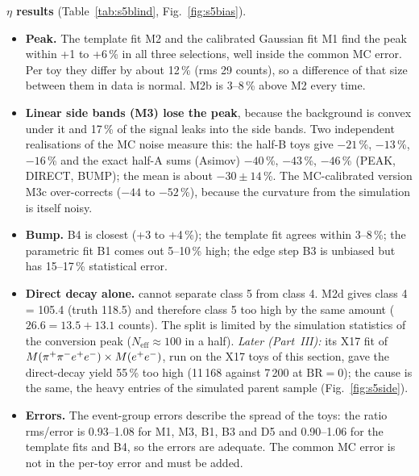 \textbf{$\eta$ results} (Table~\ref{tab:s5blind}, Fig.~\ref{fig:s5bias}).
\begin{itemize}
\item \textbf{Peak.} The template fit M2 and the calibrated Gaussian fit M1 find the peak within
      +1 to +6\,\% in all three selections, well inside the common MC error. Per toy they differ by
      about 12\,\% (rms 29 counts), so a difference of that size between them in data is normal.
      M2b is 3--8\,\% above M2 every time.
\item \textbf{Linear side bands (M3) lose the peak}, because the background is convex under it and
      17\,\% of the signal leaks into the side bands. Two independent realisations of the MC noise
      measure this: the half-B toys give $-21$\,\%, $-13$\,\%, $-16$\,\% and the exact half-A sums
      (Asimov) $-40$\,\%, $-43$\,\%, $-46$\,\% (PEAK, DIRECT, BUMP); the mean is about $-30\pm14$\,\%.
      The MC-calibrated version M3c over-corrects ($-44$ to $-52$\,\%), because the curvature from
      the simulation is itself noisy.
\item \textbf{Bump.} B4 is closest (+3 to +4\,\%); the template fit agrees within 3--8\,\%; the
      parametric fit B1 comes out 5--10\,\% high; the edge step B3 is unbiased but has 15--17\,\%
      statistical error.
\item \textbf{Direct decay alone.} \Mfour cannot separate class 5 from class 4. M2d gives
      class 4 = 105.4 (truth 118.5) and therefore class 5 too high by the same amount
      ($26.6 = 13.5 + 13.1$ counts). The split is limited by the simulation statistics of the
      conversion peak ($N_{\mathrm{eff}}\approx100$ in a half). \emph{Later (Part~III):} its X17 fit of
      $M(\pi^{+}\pi^{-}e^{+}e^{-})\times M(e^{+}e^{-})$, run on the X17 toys of this section, gave the direct-decay yield 55\,\% too high (11\,168 against
      7\,200 at $\mathrm{BR}=0$); the cause is the same, the heavy entries of the simulated parent sample (Fig.~\ref{fig:s5side}).
\item \textbf{Errors.} The event-group errors describe the spread of the toys: the ratio rms/error
      is 0.93--1.08 for M1, M3, B1, B3 and D5 and 0.90--1.06 for the template fits and B4, so the
      errors are adequate. The common MC error is not in the per-toy error and must be added.
\end{itemize}

